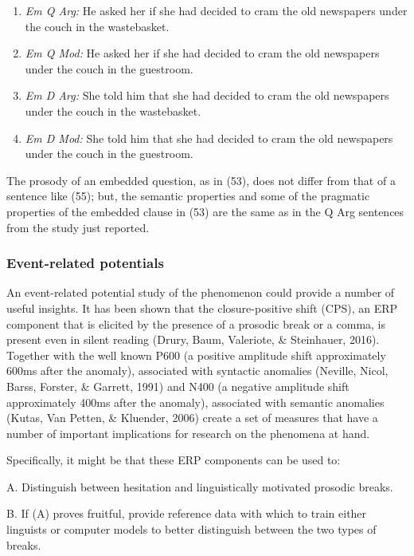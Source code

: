 \documentclass[11pt,oneside]{book}
\begin{document}
\begin{enumerate}
\def\labelenumi{(\arabic{enumi})}
\setcounter{enumi}{52}
\item
  \emph{Em Q Arg:} He asked her if she had decided to cram the old newspapers under the couch in the wastebasket.
\item
  \emph{Em Q Mod:} He asked her if she had decided to cram the old newspapers under the couch in the guestroom.
\item
  \emph{Em D Arg:} She told him that she had decided to cram the old newspapers under the couch in the wastebasket.
\item
  \emph{Em D Mod:} She told him that she had decided to cram the old newspapers under the couch in the guestroom.
\end{enumerate}

The prosody of an embedded question, as in (53), does not differ from that of a sentence like (55); but, the semantic properties and some of the pragmatic properties of the embedded clause in (53) are the same as in the Q Arg sentences from the study just reported.

\hypertarget{erp}{%
\subsubsection{Event-related potentials}\label{erp}}

An event-related potential study of the phenomenon could provide a number of useful insights. It has been shown that the closure-positive shift (CPS), an ERP component that is elicited by the presence of a prosodic break or a comma, is present even in silent reading (Drury, Baum, Valeriote, \& Steinhauer, 2016). Together with the well known P600 (a positive amplitude shift approximately 600ms after the anomaly), associated with syntactic anomalies (Neville, Nicol, Barss, Forster, \& Garrett, 1991) and N400 (a negative amplitude shift approximately 400ms after the anomaly), associated with semantic anomalies (Kutas, Van Petten, \& Kluender, 2006) create a set of measures that have a number of important implications for research on the phenomena at hand.

Specifically, it might be that these ERP components can be used to:

A. Distinguish between hesitation and linguistically motivated prosodic breaks.

B. If (A) proves fruitful, provide reference data with which to train either linguists or computer models to better distinguish between the two types of breaks.
\end{document}
